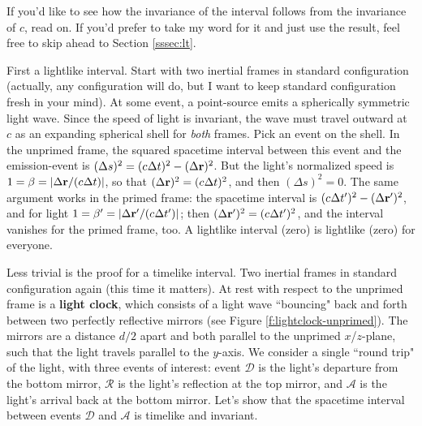 \documentclass[12pt]{article}
\renewcommand{\vv}[1]{\mathbf{#1}}
\begin{document}
If you'd like to see how the invariance of the interval follows from the invariance of $c$, read on. If you'd prefer to take my word for it and just use the result, feel free to skip ahead to Section \ref{sssec:lt}.

First a lightlike interval. Start with two inertial frames in standard configuration (actually, any configuration will do, but I want to keep standard configuration fresh in your mind). At some event, a point-source emits a spherically symmetric light wave. Since the speed of light is invariant, the wave must travel outward at $c$ as an expanding spherical shell for \emph{both} frames. Pick an event on the shell. In the unprimed frame, the squared spacetime interval between this event and the emission-event is $(\Delta s)^2 = (c \mkern.5mu \Delta t)^2 - ( \Delta \vv r )^2$. But the light's normalized speed is $1 = \beta = \vert \Delta \vv r / (c \mkern.5mu \Delta t) \vert $, so that $( \Delta \vv r )^2 = (c \mkern.5mu \Delta t)^2$, and then $(\Delta s)^2 = 0$. The same argument works in the primed frame: the spacetime interval is $(c \mkern.5mu \Delta t^{\prime})^2 - ( \Delta \vv r^{\prime} )^2$, and for light $1 = \beta^{\prime} = \vert \Delta \vv r^{\prime} / (c \mkern.5mu \Delta t^{\prime}) \vert $; then $( \Delta \vv r^{\prime} )^2 = (c \mkern.5mu \Delta t^{\prime})^2$, and the interval vanishes for the primed frame, too. A lightlike interval (zero) is lightlike (zero) for everyone.

Less trivial is the proof for a timelike interval. Two inertial frames in standard configuration again (this time it matters). At rest with respect to the unprimed frame is a \textbf{light clock}, which consists of a light wave ``bouncing" back and forth between two perfectly reflective mirrors (see Figure \ref{f:lightclock-unprimed}). The mirrors are a distance $d/2$ apart and both parallel to the unprimed $x$/$z$-plane, such that the light travels parallel to the $y$-axis. We consider a single ``round trip" of the light, with three events of interest: event $\mathcal{D}$ is the light's departure from the bottom mirror, $\mathcal{R}$ is the light's reflection at the top mirror, and $\mathcal{A}$ is the light's arrival back at the bottom mirror. Let's show that the spacetime interval between events $\mathcal{D}$ and $\mathcal{A}$ is timelike and invariant.
\end{document}

